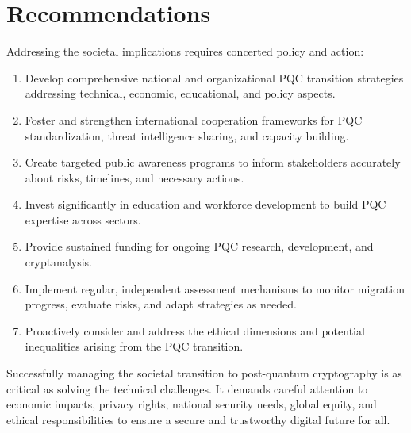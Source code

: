 \section{Recommendations}\label{sec:recommendations_ch9}

Addressing the societal implications requires concerted policy and action:
\begin{enumerate}
    \item Develop comprehensive national and organizational PQC transition strategies addressing technical, economic, educational, and policy aspects.
    \item Foster and strengthen international cooperation frameworks for PQC standardization, threat intelligence sharing, and capacity building.
    \item Create targeted public awareness programs to inform stakeholders accurately about risks, timelines, and necessary actions.
    \item Invest significantly in education and workforce development to build PQC expertise across sectors.
    \item Provide sustained funding for ongoing PQC research, development, and cryptanalysis.
    \item Implement regular, independent assessment mechanisms to monitor migration progress, evaluate risks, and adapt strategies as needed.
    \item Proactively consider and address the ethical dimensions and potential inequalities arising from the PQC transition.
\end{enumerate}

Successfully managing the societal transition to post-quantum cryptography is as critical as solving the technical challenges. It demands careful attention to economic impacts, privacy rights, national security needs, global equity, and ethical responsibilities to ensure a secure and trustworthy digital future for all.